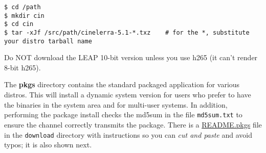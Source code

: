 \begin{lstlisting}[numbers=none]
$ cd /path
$ mkdir cin
$ cd cin
$ tar -xJf /src/path/cinelerra-5.1-*.txz    # for the *, substitute your distro tarball name
\end{lstlisting}

Do NOT download the LEAP 10-bit version unless you use h265 (it can't render 8-bit h265).

The \textbf{pkgs} directory contains the standard packaged application for various distros.  
This will install a dynamic system version for users who prefer to have the binaries in the system area and for multi-user systems.  
In addition, performing the package install checks the md5sum in the file \texttt{md5sum.txt} to ensure the channel correctly transmits the package.  
There is a {\small \href{https://cinelerra-gg.org/download/README.pkgs}{README.pkgs}} file in the \texttt{download} directory with instructions so you can \textit{ cut and paste} and avoid typos; it is also shown next.


